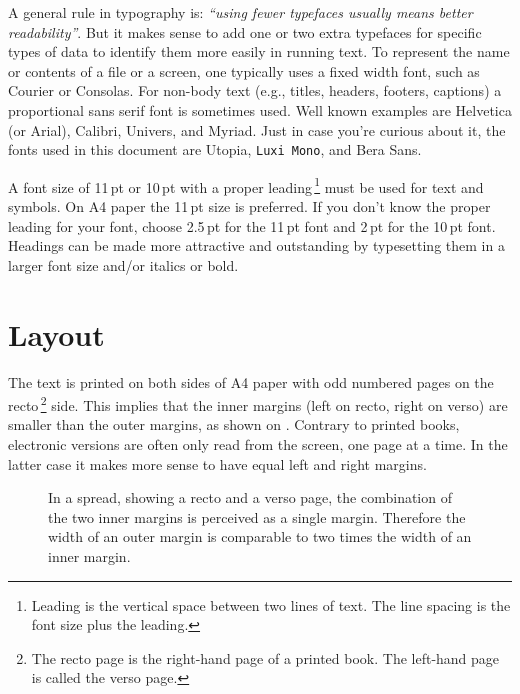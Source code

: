 \documentclass[11pt,article,oneside,a4paper]{memoir}
\newcommand*\rmfontname{Utopia}
\newcommand*\sffontname{Bera Sans}}%
\newcommand*\sffontname{Helvetica}}
\newcommand*\ttfontname{Luxi Mono}}%
\newcommand*\ttfontname{Latin Modern Typewriter}}
\begin{document}
A general rule in typography is: \emph{``using fewer typefaces usually means
  better readability''}. But it makes sense to add one or two extra
typefaces for specific types of data to identify them more easily in
running text. To represent the name or contents of a file or a screen, one
typically uses a fixed width font, such as Courier or Consolas. For
non-body text (e.g., titles, headers, footers, captions) a proportional
sans serif font is sometimes used. Well known examples are Helvetica (or
Arial), Calibri, Univers, and Myriad. Just in case you're curious about it,
the fonts used in this document are \rmfontname, \texttt{\ttfontname}, and
\textsf{\sffontname}.

A font size of 11\,pt or 10\,pt with a proper leading\,\footnote{Leading is
  the vertical space between two lines of text. The line spacing is the
  font size plus the leading.} must be used for text and symbols. On A4
paper the 11\,pt size is preferred. If you don't know the proper leading
for your font, choose 2.5\,pt for the 11\,pt font and 2\,pt for the 10\,pt
font. Headings can be made more attractive and outstanding by typesetting
them in a larger font size and/or italics or bold.

\section{Layout}
The text is printed on both sides of A4 paper with odd numbered pages on the
recto\,\footnote{The recto page is the right-hand page of a printed book. The
  left-hand page is called the verso page.} side. This implies that the inner
margins (left on recto, right on verso) are smaller than the outer margins, as
shown on . Contrary to printed books, electronic versions are
often only read from the screen, one page at a time. In the latter case it
makes more sense to have equal left and right margins.

\begin{figure}
  \centering
  \begin{minipage}[b]{0.5\textwidth}
  \end{minipage}
  \caption{In a spread, showing a recto and a verso page, the combination of
    the two inner margins is perceived as a single margin. Therefore the width
    of an outer margin is comparable to two times the width of an inner
    margin.}
  \label{fig:spread}
\end{figure}
\end{document}

